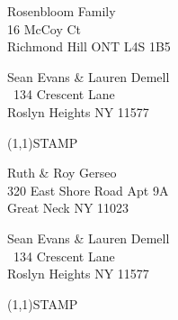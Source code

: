 \documentclass[12pt]{article}
\begin{document}
\begin{center} \begin{Huge} \vspace*{\fill}
Rosenbloom Family\\
16 McCoy Ct\\
Richmond Hill ONT L4S 1B5\\
\vspace{\fill} \end{Huge} \end{center}

\clearpage

\begin{minipage}{.5\linewidth} \noindent
Sean Evans \& Lauren Demell\\\ 
134 Crescent Lane\\ 
Roslyn Heights NY 11577
\end{minipage}
\begin{minipage}{.5\linewidth \hspace{-.2in} \vspace{-.3in}}
\begin{flushright}
\framebox(1,1){STAMP}
\end{flushright}
\end{minipage}

\begin{center} \begin{Huge} \vspace*{\fill}
Ruth \& Roy Gerseo\\
320 East Shore Road Apt 9A\\
Great Neck NY 11023\\
\vspace{\fill} \end{Huge} \end{center}

\clearpage

\begin{minipage}{.5\linewidth} \noindent
Sean Evans \& Lauren Demell\\\ 
134 Crescent Lane\\ 
Roslyn Heights NY 11577
\end{minipage}
\begin{minipage}{.5\linewidth \hspace{-.2in} \vspace{-.3in}}
\begin{flushright}
\framebox(1,1){STAMP}
\end{flushright}
\end{minipage}
\end{document}
